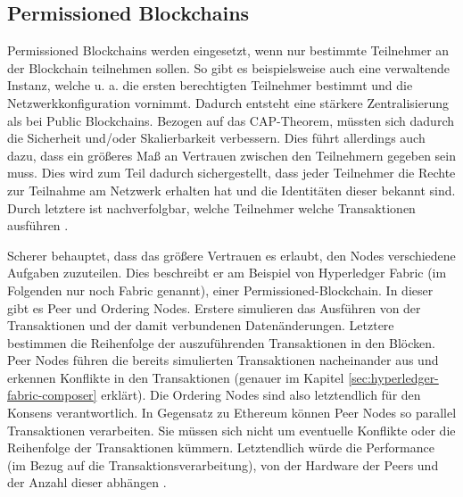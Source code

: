 \subsection{Permissioned Blockchains}
Permissioned Blockchains werden eingesetzt, wenn nur bestimmte Teilnehmer an der Blockchain teilnehmen sollen. So gibt es beispielsweise auch eine verwaltende Instanz, welche u. a. die ersten berechtigten Teilnehmer bestimmt und die Netzwerkkonfiguration vornimmt. Dadurch entsteht eine stärkere Zentralisierung als bei Public Blockchains. Bezogen auf das CAP-Theorem, müssten sich dadurch die Sicherheit und/oder Skalierbarkeit verbessern. Dies führt allerdings auch dazu, dass ein größeres Maß an Vertrauen zwischen den Teilnehmern gegeben sein muss. Dies wird zum Teil dadurch sichergestellt, dass jeder Teilnehmer die Rechte zur Teilnahme am Netzwerk erhalten hat und die Identitäten dieser bekannt sind. Durch letztere ist nachverfolgbar, welche Teilnehmer welche Transaktionen ausführen \cite{SchererPerformanceScalabilityBlockchain2017}.

Scherer behauptet, dass das größere Vertrauen es erlaubt, den Nodes verschiedene Aufgaben zuzuteilen. Dies beschreibt er am Beispiel von Hyperledger Fabric (im Folgenden nur noch Fabric genannt), einer Permissioned-Blockchain. In dieser gibt es Peer und Ordering Nodes. Erstere simulieren das Ausführen von der Transaktionen und der damit verbundenen Datenänderungen. Letztere bestimmen die Reihenfolge der auszuführenden Transaktionen in den Blöcken. Peer Nodes führen die bereits simulierten Transaktionen nacheinander aus und erkennen Konflikte in den Transaktionen (genauer im Kapitel \ref{sec:hyperledger-fabric-composer} erklärt). Die Ordering Nodes sind also letztendlich für den Konsens verantwortlich. In Gegensatz zu Ethereum können Peer Nodes so parallel Transaktionen verarbeiten. Sie müssen sich nicht um eventuelle Konflikte oder die Reihenfolge der Transaktionen kümmern. Letztendlich würde die Performance (im Bezug auf die Transaktionsverarbeitung), von der Hardware der Peers und der Anzahl dieser abhängen \cite{SchererPerformanceScalabilityBlockchain2017}.

